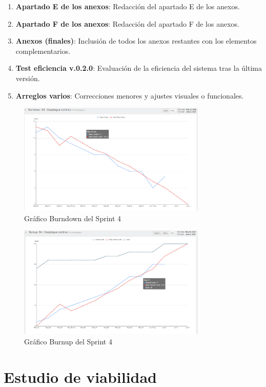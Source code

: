 \begin{enumerate}
\item \textbf{Apartado E de los anexos}: Redacción del apartado E de los anexos.
\item \textbf{Apartado F de los anexos}: Redacción del apartado F de los anexos.
\item \textbf{Anexos (finales)}: Inclusión de todos los anexos restantes con los elementos complementarios.
\item \textbf{Test eficiencia v.0.2.0}: Evaluación de la eficiencia del sistema tras la última versión.
\item \textbf{Arreglos varios}: Correcciones menores y ajustes visuales o funcionales.
\end{enumerate}

\begin{figure}[H]
\centering
\includegraphics[width=0.8\textwidth]{img/BurndownS4.png}
\caption{Gráfico Burndown del Sprint 4}
\label{fig:BurndownS4}
\end{figure}

\begin{figure}[H]
\centering
\includegraphics[width=0.8\textwidth]{img/BurnupS4.png}
\caption{Gráfico Burnup del Sprint 4}
\label{fig:BurnupS4}
\end{figure}

\section{Estudio de viabilidad}

